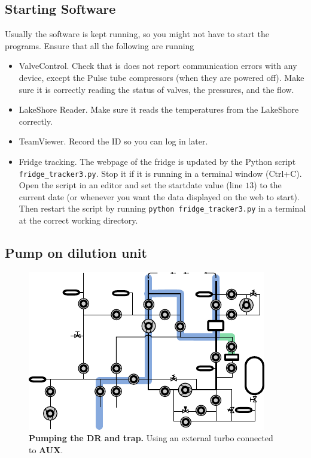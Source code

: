 \documentclass{article}[18pt,A4]
\newcommand{\thing}[1]{{\color{gray}\textsc{ \textbf{#1}}}}
\begin{document}
\subsection{Starting Software}
Usually the software is kept running, so you might not have to start the programs.
Ensure that all the following are running
\begin{itemize}
    \item ValveControl.
    Check that is does not report communication errors with any device,
    except the Pulse tube compressors (when they are powered off).
    Make sure it is correctly reading the status of valves, the pressures, and the flow.
    \item LakeShore Reader.
    Make sure it reads the temperatures from the LakeShore correctly.
    \item TeamViewer. Record the ID so you can log in later.
    \item Fridge tracking. The webpage of the fridge is updated by the Python script
    \texttt{fridge\_tracker3.py}. Stop it if it is running in a terminal window (Ctrl+C).
    Open the script in an editor and set the startdate value (line $13$) to the current
    date (or whenever you want the data displayed on the web to start).
    Then restart the script by running \texttt{python fridge\_tracker3.py} in a terminal at the correct working directory.
\end{itemize}

\newpage
\subsection{Pump on dilution unit}

\begin{figure}[ht]
\centering
\includegraphics{fig/blu_fors_ghs_pump_dilution_unit.pdf}
\caption{\textbf{Pumping the DR and trap.} Using an external turbo connected to \thing{AUX}. 
\label{fig:bfgpbu}
}
\end{figure}
\end{document}
